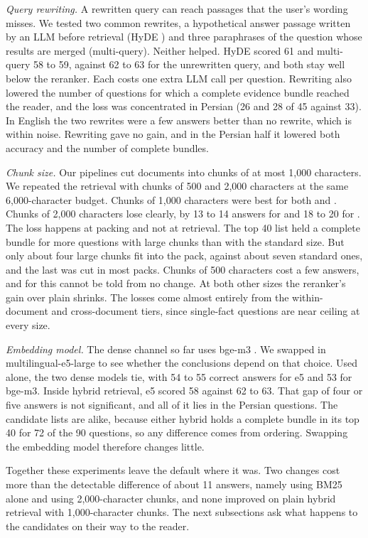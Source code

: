 \emph{Query rewriting.} A rewritten query can reach passages that the user's wording misses. We tested two common rewrites, a hypothetical answer passage written by an LLM before retrieval (HyDE \citep{gao2023hyde}) and three paraphrases of the question whose results are merged (multi-query). Neither helped. HyDE scored 61 and multi-query 58 to 59, against 62 to 63 for the unrewritten query, and both stay well below the reranker. Each costs one extra LLM call per question. Rewriting also lowered the number of questions for which a complete evidence bundle reached the reader, and the loss was concentrated in Persian (26 and 28 of 45 against 33). In English the two rewrites were a few answers better than no rewrite, which is within noise. Rewriting gave no gain, and in the Persian half it lowered both accuracy and the number of complete bundles.

\emph{Chunk size.} Our pipelines cut documents into chunks of at most 1,000 characters. We repeated the retrieval with chunks of 500 and 2,000 characters at the same 6,000-character budget. Chunks of 1,000 characters were best for both \hybrid{} and \hr. Chunks of 2,000 characters lose clearly, by 13 to 14 answers for \hybrid{} and 18 to 20 for \hr. The loss happens at packing and not at retrieval. The top 40 list held a complete bundle for more questions with large chunks than with the standard size. But only about four large chunks fit into the pack, against about seven standard ones, and the last was cut in most packs. Chunks of 500 characters cost a few answers, and for \hybrid{} this cannot be told from no change. At both other sizes the reranker's gain over plain \hybrid{} shrinks. The losses come almost entirely from the within-document and cross-document tiers, since single-fact questions are near ceiling at every size.

\emph{Embedding model.} The dense channel so far uses bge-m3 \citep{chen2024bgem3}. We swapped in multilingual-e5-large to see whether the conclusions depend on that choice. Used alone, the two dense models tie, with 54 to 55 correct answers for e5 and 53 for bge-m3. Inside hybrid retrieval, e5 scored 58 against 62 to 63. That gap of four or five answers is not significant, and all of it lies in the Persian questions. The candidate lists are alike, because either hybrid holds a complete bundle in its top 40 for 72 of the 90 questions, so any difference comes from ordering. Swapping the embedding model therefore changes little.

Together these experiments leave the default where it was. Two changes cost more than the detectable difference of about 11 answers, namely using BM25 alone and using 2,000-character chunks, and none improved on plain hybrid retrieval with 1,000-character chunks. The next subsections ask what happens to the candidates on their way to the reader.
